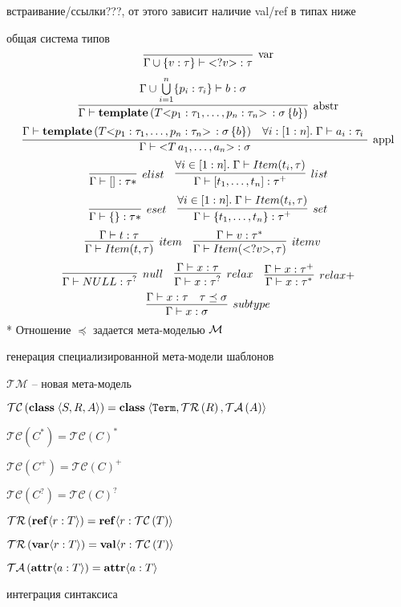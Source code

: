 встраивание/ссылки???, от этого зависит наличие val/ref в типах ниже

общая система типов
$$
\trule{}{\Gamma \cup \{v : \tau\} \vdash \ang{?v} : \tau}{var}
$$ 
$$
\trule{
	\Gamma \cup \bigcup\limits_{i=1}^{n} \{ p_i : \tau_i \} \vdash b : \sigma
}{
	\Gamma \vdash \mathbf{template}\left(
		T \ang{p_1 : \tau_1, \ldots, p_n : \tau_n} \,: \sigma \, \{ b \}
	\right)
}{abstr}
$$ 
$$
\trule{
	\Gamma \vdash \mathbf{template}\left(
		T \ang{p_1 : \tau_1, \ldots, p_n : \tau_n} \,: \sigma \, \{ b \}
	\right)
	&
	\forall i : [1:n].\; \Gamma \vdash a_i : \tau_i \
}{
	\Gamma \vdash \ang{T \, a_1, \ldots, a_n} : \sigma
}{appl}
$$
$$
\infer[elist]{\Gamma \vdash [] : \tau*}{}
\quad
\infer[list]{
	\Gamma \vdash [t_1,\ldots,t_n] : \tau^+
}{
	\forall i \in [1:n].\; \Gamma \vdash Item(t_i, \tau)
}
$$
$$
\infer[eset]{\Gamma \vdash \{\} : \tau*}{}
\quad
\infer[set]{
	\Gamma \vdash \{t_1,\ldots,t_n\} : \tau^+
}{
	\forall i \in [1:n].\; \Gamma \vdash Item(t_i, \tau)
}
$$
$$
\infer[item]{
	\Gamma \vdash Item(t, \tau)
}{
	\Gamma \vdash t : \tau
}
\quad
\infer[itemv]{
	\Gamma \vdash Item(\ang{?v}, \tau)
}{
	\Gamma \vdash v : \tau^*
}
\quad
$$
$$
\infer[null]{
	\Gamma \vdash NULL : \tau^?
}{}
\quad
\infer[relax]{
	\Gamma \vdash x : \tau^?
}{
	\Gamma \vdash x : \tau
}
\quad
\infer[relax+]{
	\Gamma \vdash x : \tau^*
}{
	\Gamma \vdash x : \tau^+
}
$$
$$
\infer[subtype]{
	\Gamma \vdash x : \sigma
}{
	\Gamma \vdash x : \tau &
	\tau \preceq \sigma
}
$$
* Отношение $\preceq$ задается мета-моделью $\mathcal{M}$

генерация специализированной мета-модели шаблонов

\newcommand{\TM}{\mathcal{TM}}
\newcommand{\TC}[1]{\mathcal{TC}\left(#1\right)}
\newcommand{\TR}[1]{\mathcal{TR}\left(#1\right)}
\newcommand{\TA}[1]{\mathcal{TA}\left(#1\right)}

$\TM$ -- новая мета-модель

$\TC{\class{}{S}{R}{A}} = \class{}
			{\mathtt{Term}}{\TR{R}}{\TA{A}}$
			
$\TC{C^*} = \TC{C}^*$

$\TC{C^+} = \TC{C}^+$

$\TC{C^?} = \TC{C}^?$

$\TR{\reference{ref}{r}{T}} = \reference{ref}{r}{\TC{T}}$

$\TR{\reference{var}{r}{T}} = \reference{val}{r}{\TC{T}}$

$\TA{\attribute{a}{T}} = \attribute{a}{T}$

интеграция синтаксиса

